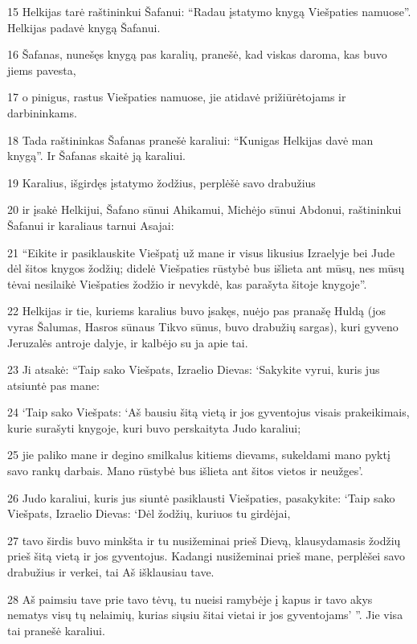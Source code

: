 \par 15 Helkijas tarė raštininkui Šafanui: “Radau įstatymo knygą Viešpaties namuose”. Helkijas padavė knygą Šafanui. 
\par 16 Šafanas, nunešęs knygą pas karalių, pranešė, kad viskas daroma, kas buvo jiems pavesta, 
\par 17 o pinigus, rastus Viešpaties namuose, jie atidavė prižiūrėtojams ir darbininkams. 
\par 18 Tada raštininkas Šafanas pranešė karaliui: “Kunigas Helkijas davė man knygą”. Ir Šafanas skaitė ją karaliui. 
\par 19 Karalius, išgirdęs įstatymo žodžius, perplėšė savo drabužius 
\par 20 ir įsakė Helkijui, Šafano sūnui Ahikamui, Michėjo sūnui Abdonui, raštininkui Šafanui ir karaliaus tarnui Asajai: 
\par 21 “Eikite ir pasiklauskite Viešpatį už mane ir visus likusius Izraelyje bei Jude dėl šitos knygos žodžių; didelė Viešpaties rūstybė bus išlieta ant mūsų, nes mūsų tėvai nesilaikė Viešpaties žodžio ir nevykdė, kas parašyta šitoje knygoje”. 
\par 22 Helkijas ir tie, kuriems karalius buvo įsakęs, nuėjo pas pranašę Huldą (jos vyras Šalumas, Hasros sūnaus Tikvo sūnus, buvo drabužių sargas), kuri gyveno Jeruzalės antroje dalyje, ir kalbėjo su ja apie tai. 
\par 23 Ji atsakė: “Taip sako Viešpats, Izraelio Dievas: ‘Sakykite vyrui, kuris jus atsiuntė pas mane: 
\par 24 ‘Taip sako Viešpats: ‘Aš bausiu šitą vietą ir jos gyventojus visais prakeikimais, kurie surašyti knygoje, kuri buvo perskaityta Judo karaliui; 
\par 25 jie paliko mane ir degino smilkalus kitiems dievams, sukeldami mano pyktį savo rankų darbais. Mano rūstybė bus išlieta ant šitos vietos ir neužges’. 
\par 26 Judo karaliui, kuris jus siuntė pasiklausti Viešpaties, pasakykite: ‘Taip sako Viešpats, Izraelio Dievas: ‘Dėl žodžių, kuriuos tu girdėjai, 
\par 27 tavo širdis buvo minkšta ir tu nusižeminai prieš Dievą, klausydamasis žodžių prieš šitą vietą ir jos gyventojus. Kadangi nusižeminai prieš mane, perplėšei savo drabužius ir verkei, tai Aš išklausiau tave. 
\par 28 Aš paimsiu tave prie tavo tėvų, tu nueisi ramybėje į kapus ir tavo akys nematys visų tų nelaimių, kurias siųsiu šitai vietai ir jos gyventojams’ ”. Jie visa tai pranešė karaliui. 
